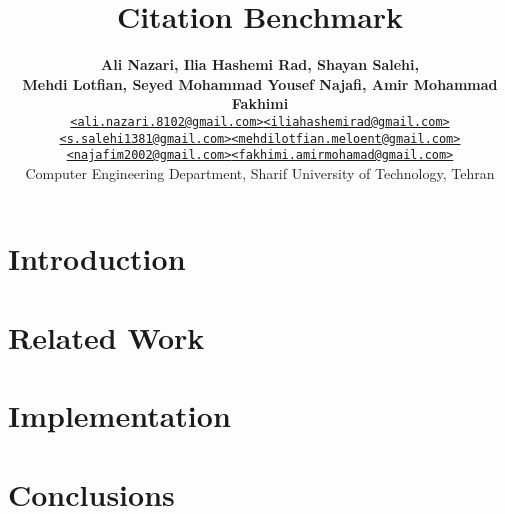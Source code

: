 \documentclass[a4paper, twocolumn]{article}
\title{\vspace{-1.5em}\textbf{Citation Benchmark}}
\author{{\textbf{Ali Nazari,  Ilia Hashemi Rad, Shayan Salehi, }} \\
        {\textbf{Mehdi Lotfian, Seyed Mohammad Yousef Najafi, Amir Mohammad Fakhimi}} \\
        {\href{ali.nazari.8102@gmail.com}{\texttt{<ali.nazari.8102@gmail.com>}}\href{iliahashemirad@gmail.com}{\texttt{<iliahashemirad@gmail.com>}}} \\ 
        {\href{s.salehi1381@gmail.com}{\texttt{<s.salehi1381@gmail.com>}}\href{mehdilotfian.meloent@gmail.com}{\texttt{<mehdilotfian.meloent@gmail.com>}}} \\   
        {\href{najafim2002@gmail.com}{\texttt{<najafim2002@gmail.com>}}\href{fakhimi.amirmohamad@gmail.com}{\texttt{<fakhimi.amirmohamad@gmail.com>}}} \\
        {Computer Engineering Department, Sharif University of Technology, Tehran}}
\begin{document}
    \maketitle

    \begin{abstract}  \end{abstract} %
    \section{Introduction} \label{sec:introduction} 
    \section{Related Work} \label{sec:related_work} 
    \section{Implementation} \label{sec:implementation} 
    \section{Conclusions} \label{sec:conclusions} 

    \nocite{*} %
    
    
    \appendix

    
\end{document}
